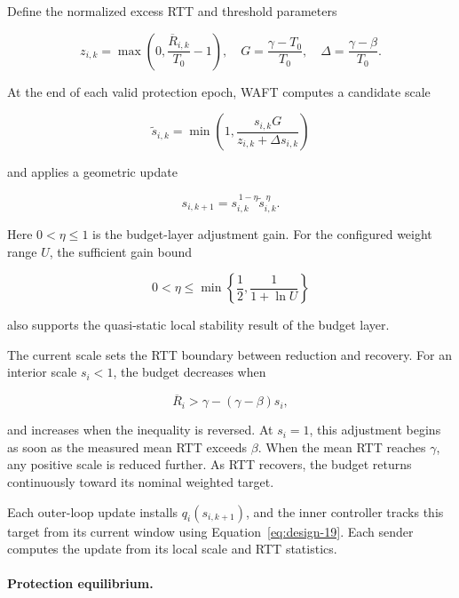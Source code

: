 Define the normalized excess RTT and threshold parameters

\begin{equation}
\label{eq:design-35}
z_{i,k}
=
\max\left(0,\frac{\overline R_{i,k}}{T_0}-1\right),
\quad
G=\frac{\gamma-T_0}{T_0},
\quad
\Delta=\frac{\gamma-\beta}{T_0}.
\end{equation}

At the end of each valid protection epoch, WAFT computes a candidate scale

\begin{equation}
\label{eq:design-36}
\widetilde s_{i,k}
=
\min\left(
1,\frac{s_{i,k}G}{z_{i,k}+\Delta s_{i,k}}
\right)
\end{equation}

and applies a geometric update

\begin{equation}
\label{eq:design-37}
\boxed{
s_{i,k+1}
=
s_{i,k}^{\,1-\eta}
\widetilde s_{i,k}^{\,\eta}.
}
\end{equation}

Here \(0<\eta\le1\) is the budget-layer adjustment gain. For the configured weight range \(U\), the sufficient gain bound

\begin{equation}
\label{eq:design-38}
0<\eta\le
\min\left\{\frac12,\frac{1}{1+\ln U}\right\}
\end{equation}

also supports the quasi-static local stability result of the budget layer.

The current scale sets the RTT boundary between reduction and recovery. For an interior scale \(s_i<1\), the budget decreases when

\begin{equation}
\label{eq:design-39}
\overline R_i>\gamma-(\gamma-\beta)s_i,
\end{equation}

and increases when the inequality is reversed. At \(s_i=1\), this adjustment begins as soon as the measured mean RTT exceeds \(\beta\). When the mean RTT reaches \(\gamma\), any positive scale is reduced further. As RTT recovers, the budget returns continuously toward its nominal weighted target.

Each outer-loop update installs \(q_i(s_{i,k+1})\), and the inner controller tracks this target from its current window using Equation~\eqref{eq:design-19}. Each sender computes the update from its local scale and RTT statistics.

\paragraph{Protection equilibrium.}

